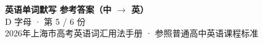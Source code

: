 \documentclass[10pt,a4paper]{article}
\begin{document}
\pagestyle{plain}

\begin{center}
{\LARGE\bfseries 英语单词默写 \quad 参考答案（中 $\to$ 英）}\\[0.22em]
{\large D 字母 · 第 5 / 6 份}\\[0.18em]
{\small 2026年上海市高考英语词汇用法手册 · 参照普通高中英语课程标准}
\end{center}

\vspace{0.2em}
\noindent{\color{rulegray}\rule{\textwidth}{0.8pt}}

\vspace{0.35em}

\vspace{0.25em}
\renewcommand{\arraystretch}{1.32}
\end{document}
